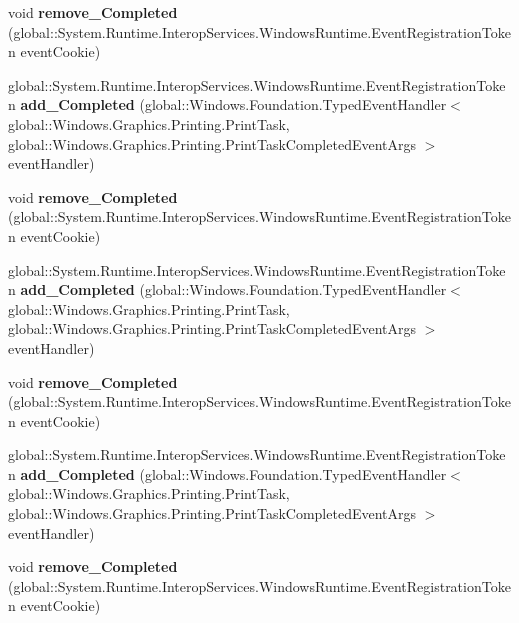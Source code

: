 \begin{DoxyCompactItemize}
void {\bfseries remove\+\_\+\+Completed} (global\+::\+System.\+Runtime.\+Interop\+Services.\+Windows\+Runtime.\+Event\+Registration\+Token event\+Cookie)
\item 
\mbox{\label{interface_windows_1_1_graphics_1_1_printing_1_1_i_print_task_a0c2d1c616b4234ee831091b8f9df376e}} 
global\+::\+System.\+Runtime.\+Interop\+Services.\+Windows\+Runtime.\+Event\+Registration\+Token {\bfseries add\+\_\+\+Completed} (global\+::\+Windows.\+Foundation.\+Typed\+Event\+Handler$<$ global\+::\+Windows.\+Graphics.\+Printing.\+Print\+Task, global\+::\+Windows.\+Graphics.\+Printing.\+Print\+Task\+Completed\+Event\+Args $>$ event\+Handler)
\item 
\mbox{\label{interface_windows_1_1_graphics_1_1_printing_1_1_i_print_task_a5a748e96ef89c22a0070e64b59bab25b}} 
void {\bfseries remove\+\_\+\+Completed} (global\+::\+System.\+Runtime.\+Interop\+Services.\+Windows\+Runtime.\+Event\+Registration\+Token event\+Cookie)
\item 
\mbox{\label{interface_windows_1_1_graphics_1_1_printing_1_1_i_print_task_a0c2d1c616b4234ee831091b8f9df376e}} 
global\+::\+System.\+Runtime.\+Interop\+Services.\+Windows\+Runtime.\+Event\+Registration\+Token {\bfseries add\+\_\+\+Completed} (global\+::\+Windows.\+Foundation.\+Typed\+Event\+Handler$<$ global\+::\+Windows.\+Graphics.\+Printing.\+Print\+Task, global\+::\+Windows.\+Graphics.\+Printing.\+Print\+Task\+Completed\+Event\+Args $>$ event\+Handler)
\item 
\mbox{\label{interface_windows_1_1_graphics_1_1_printing_1_1_i_print_task_a5a748e96ef89c22a0070e64b59bab25b}} 
void {\bfseries remove\+\_\+\+Completed} (global\+::\+System.\+Runtime.\+Interop\+Services.\+Windows\+Runtime.\+Event\+Registration\+Token event\+Cookie)
\item 
\mbox{\label{interface_windows_1_1_graphics_1_1_printing_1_1_i_print_task_a0c2d1c616b4234ee831091b8f9df376e}} 
global\+::\+System.\+Runtime.\+Interop\+Services.\+Windows\+Runtime.\+Event\+Registration\+Token {\bfseries add\+\_\+\+Completed} (global\+::\+Windows.\+Foundation.\+Typed\+Event\+Handler$<$ global\+::\+Windows.\+Graphics.\+Printing.\+Print\+Task, global\+::\+Windows.\+Graphics.\+Printing.\+Print\+Task\+Completed\+Event\+Args $>$ event\+Handler)
\item 
\mbox{\label{interface_windows_1_1_graphics_1_1_printing_1_1_i_print_task_a5a748e96ef89c22a0070e64b59bab25b}} 
void {\bfseries remove\+\_\+\+Completed} (global\+::\+System.\+Runtime.\+Interop\+Services.\+Windows\+Runtime.\+Event\+Registration\+Token event\+Cookie)
\end{DoxyCompactItemize}


